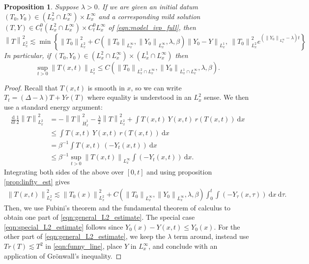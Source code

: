 \documentclass[twosided, 12pt]{article}
\numberwithin{equation}{section}
\theoremstyle{plain}
\newtheorem{prop}[thm]{Proposition}
\newcommand{\diff}{\mathrm{d}}
\begin{document}
\begin{prop} \label{prop:l2_est} 
    Suppose $\lambda >0$. If we are given an initial datum $(T_0, Y_0)\in \left(L^{2}_{x}\cap L^{\infty}_{x}\right)\times L^{\infty}_{x}$ and a corresponding mild solution $(T,Y)\in C^{0}_{t}\left(L^{2}_{x}\cap L^{\infty}_{x}\right)\times C^{0}_{t}L^{\infty}_{x}$ of \eqref{eqn:model_ivp_full}, then
    \begin{equation}\label{eqn:general_L2_estimate}
        \left\|T\right\|_{L^2_{x}}^2 \lesssim \min\left\{\left\|T_0\right\|_{L^2_{x}}^2 + C\left(\left\|T_0\right\|_{L^{\infty}_{x}}, \left\|Y_0\right\|_{ L^{\infty}_{x}}, \lambda, \beta\right)\left\|Y_0- Y\right\|_{L^1_{x}}, \ \left\|T_0\right\|_{L^2_{x}}^2 e^{\left(\left\|Y_0\right\|_{L^{\infty}_{x}}-\lambda\right)t}\right\}
    \end{equation}
    In particular, if $(T_0, Y_0)\in \left(L^{2}_{x}\cap L^{\infty}_{x}\right)\times \left(L^{1}_{x}\cap L^{\infty}_{x}\right)$ then
    \begin{equation}\label{eqn:special_L2_estimate}
        \sup_{t>0}\left\|T(x,t)\right\|_{L^2_{x}} \leq C\left(\left\|T_0\right\|_{L^2_{x}\cap L^{\infty}_{x}}, \left\|Y_0\right\|_{L^1_{x}\cap L^{\infty}_{x}}, \lambda, \beta\right). 
    \end{equation}
\end{prop}
\begin{proof}
    Recall that $T(x,t)$ is smooth in $x$, so we can write
    $T_{t} = \left(\Delta-\lambda\right) T + Yr\left(T\right)$
    where equality is understood in an $L^2_x$ sense. We then use a standard energy argument:  
    \begin{align}
    \frac{\diff}{\diff t}\frac12\left\|T\right\|_{L^2_{x}}^2 &= - \left\|T\right\|^2_{\dot{H}^1_{x}} -\frac{\lambda}{2}\left\|T\right\|^2_{L^2_x}+ \int T(x,t) \ Y(x,t) \ r\left(T(x,t)\right) \ \diff x \nonumber
    \\
    &\leq  \int T(x,t) \ Y(x,t) \ r\left(T(x,t)\right) \ \diff x \label{eqn:funny_line}
    \\
    &= \beta^{-1} \int T(x,t) \ \left(-Y_{t}(x,t)\right) \ \diff x \nonumber
    \\
    &\leq \beta^{-1}\sup_{t>0}\left\|T(x,t)\right\|_{L^{\infty}_{x}}\int  \left(-Y_{t}(x,t)\right) \ \diff x. \nonumber
    \end{align}
    Integrating both sides of the above over $[0,t]$ and using proposition \ref{prop:linfty_est} gives 
    \begin{align*}
        \left\|T(x,t)\right\|_{L^2_{x}}^2 \lesssim \left\|T_0(x)\right\|_{L^2_{x}}^2 + C\left(\left\|T_0\right\|_{L^{\infty}_{x}}, \left\|Y_0\right\|_{ L^{\infty}_{x}}, \lambda, \beta\right)\int_0^t\int \left(-Y_{\tau}(x,\tau)\right) \ \diff x \ \diff \tau.
    \end{align*}
    Then, we use Fubini's theorem and the fundamental theorem of calculus to obtain one part of \eqref{eqn:general_L2_estimate}. The special case \eqref{eqn:special_L2_estimate} follows since $Y_0(x) - Y(x,t) \leq Y_0(x)$. For the other part of \eqref{eqn:general_L2_estimate}, we keep the $\lambda$ term around, instead use $Tr(T)\lesssim T^2$ in \eqref{eqn:funny_line}, place $Y$ in $L^{\infty}_{x}$, and conclude with an application of Gr\"{o}nwall's inequality. 
\end{proof}
\end{document}
